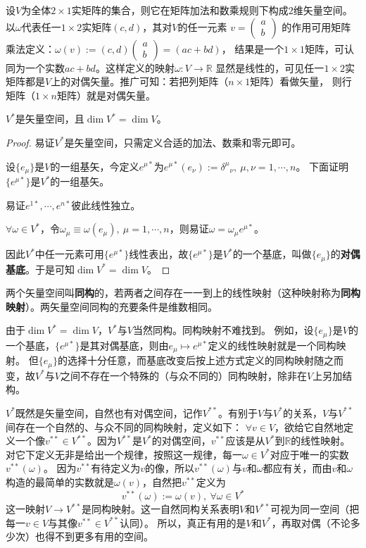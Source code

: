 \begin{example}
设$V$为全体$2 \times 1$实矩阵的集合，则它在矩阵加法和数乘规则下构成$2$维矢量空间。
以$\omega$代表任一$1 \times 2$实矩阵$(c, d)$，其对$V$的任一元素
$v = \begin{pmatrix}a \\ b\end{pmatrix}$
的作用可用矩阵乘法定义：$\omega(v) := (c, d)\begin{pmatrix}a \\ b\end{pmatrix} = (ac + bd)$，
结果是一个$1 \times 1$矩阵，可认同为一个实数$ac + bd$。这样定义的映射$\omega \colon V \to \mathbb{R}$
显然是线性的，可见任一$1 \times 2$实矩阵都是$V$上的对偶矢量。推广可知：若把列矩阵（$n \times 1$矩阵）看做矢量，
则行矩阵（$1 \times n$矩阵）就是对偶矢量。
\end{example}

\begin{theorem}
$V^*$是矢量空间，且$\dim V^* = \dim V$。
\end{theorem}

\begin{proof}
易证$V^*$是矢量空间，只需定义合适的加法、数乘和零元即可。

设$\{e_\mu\}$是$V$的一组基矢，今定义$e^{\mu*}$为$e^{\mu*}(e_\nu) := \delta^\mu{}_\nu, ~ \mu, \nu = 1, \cdots, n$。
下面证明$\{e^{\mu*}\}$是$V^*$的一组基矢。

易证$e^{1*}, \cdots, e^{n*}$彼此线性独立。

$\forall \omega \in V^*$，令$\omega_\mu \equiv \omega(e_\mu), ~ \mu = 1, \cdots, n$，则易证$\omega = \omega_\mu e^{\mu*}$。

因此$V^*$中任一元素可用$\{e^{\mu*}\}$线性表出，故$\{e^{\mu*}\}$是$V^*$的一个基底，叫做$\{e_\mu\}$的\textbf{对偶基底}。于是可知$\dim V^* = \dim V$。
\end{proof}

两个矢量空间叫\textbf{同构}的，若两者之间存在一一到上的线性映射（这种映射称为\textbf{同构映射}）。两矢量空间同构的充要条件是维数相同。

由于$\dim V^* = \dim V$，$V^*$与$V$当然同构。同构映射不难找到。
例如，设$\{e_\mu\}$是$V$的一个基底，$\{e^{\mu*}\}$是其对偶基底，则由$e_\mu \mapsto e^{\mu*}$定义的线性映射就是一个同构映射。
但$\{e_\mu\}$的选择十分任意，而基底改变后按上述方式定义的同构映射随之而变，故$V^*$与$V$之间不存在一个特殊的（与众不同的）同构映射，除非在$V$上另加结构。

$V^*$既然是矢量空间，自然也有对偶空间，记作$V^{**}$。有别于$V$与$V^*$的关系，$V$与$V^{**}$间存在一个自然的、与众不同的同构映射，定义如下：
$\forall v \in V$，欲给它自然地定义一个像$v^{**} \in V^{**}$。因为$V^{**}$是$V^*$的对偶空间，$v^{**}$应该是从$V^*$到$\mathbb{R}$的线性映射。
对它下定义无非是给出一个规律，按照这一规律，每一$\omega \in V^*$对应于唯一的实数$v^{**}(\omega)$。
因为$v^{**}$有待定义为$v$的像，所以$v^{**}(\omega)$与$v$和$\omega$都应有关，而由$v$和$\omega$构造的最简单的实数就是$\omega(v)$，自然把$v^{**}$定义为
$$v^{**}(\omega) := \omega(v), ~ \forall \omega \in V^*$$
这一映射$V \to V^{**}$是同构映射。这一自然同构关系表明$V$和$V^{**}$可视为同一空间（把每一$v \in V$与其像$v^{**} \in V^{**}$认同）。
所以，真正有用的是$V$和$V^*$，再取对偶（不论多少次）也得不到更多有用的空间。

